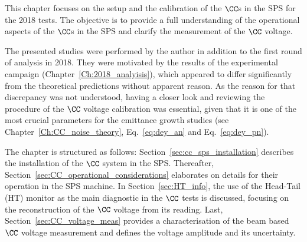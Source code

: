 \vspace*{-1mm}

This chapter focuses on the setup and the calibration of the $\CC$s in the SPS for the 2018 tests. The objective is to provide a full understanding of the operational aspects of the $\CC$s in the SPS and clarify the measurement of the $\CC$ voltage. 

The presented studies were performed by the author in addition to the first round of analysis in 2018. They were motivated by the results of the experimental campaign (Chapter~\ref{Ch:2018_analyisis}), which appeared to differ significantly from the theoretical predictions without apparent reason.
As the reason for that discrepancy was not understood, having a closer look and reviewing the procedure of the $\CC$ voltage calibration was essential, given that it is one of the most crucial parameters for the emittance growth studies (see Chapter~\ref{Ch:CC_noise_theory}, Eq.~\eqref{eq:dey_an} and Eq.~\eqref{eq:dey_pn}). 


The chapter is structured as follows: Section~\ref{sec:cc_sps_installation} describes the installation of the $\CC$ system in the SPS. Thereafter, Section~\ref{sec:CC_operational_considerations} elaborates on details for their operation in the SPS machine. In Section~\ref{sec:HT_info}, the use of the Head-Tail (HT) monitor as the main diagnostic in the $\CC$ tests is discussed, focusing on the reconstruction of the $\CC$ voltage from its reading. Last, Section~\ref{sec:CC_voltage_meas} provides a characterisation of the beam based $\CC$ voltage measurement and defines the voltage amplitude and its uncertainty.

